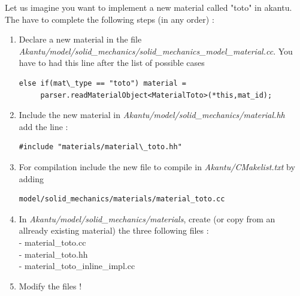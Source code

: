 \documentclass[a4paper,11pt]{book}
\begin{document}
Let us imagine you want to implement a new material called
"toto" in akantu. The have to complete the following steps (in
any order) : 
\begin{enumerate}
\item
Declare a new material in the file
     \textit{Akantu/model/solid\_mechanics/solid\_mechanics\_model\_material.cc}.
You have to had this line after the list of possible cases   
\begin{verbatim}else if(mat\_type == "toto") material =
     parser.readMaterialObject<MaterialToto>(*this,mat_id);
\end{verbatim}


\item
Include the new material in \textit{Akantu/model/solid\_mechanics/material.hh} \\
add the line :
\begin{verbatim}
#include "materials/material\_toto.hh"
\end{verbatim}

\item
For compilation include the new file to compile in
     \textit{Akantu/CMakelist.txt} by adding 
\begin{verbatim}
model/solid_mechanics/materials/material_toto.cc 
\end{verbatim}
\item
In \textit{Akantu/model/solid\_mechanics/materials}, create (or copy from
     an allready existing material) the three following files :\\
- material\_toto.cc\\
- material\_toto.hh\\
- material\_toto\_inline\_impl.cc

\item
Modify the files !

\end{enumerate}
\end{document}
